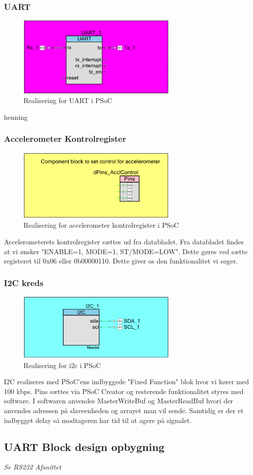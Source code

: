 \subsubsection{UART}
\begin{figure}[H]
\centering
\includegraphics[width=0.7\textwidth]{billeder/uartpsoc}
\caption{Realisering for UART i PSoC}
\label{fig:SMUARTR}
\end{figure}
henning
\subsubsection{Accelerometer Kontrolregister}
\begin{figure}[H]
\centering
\includegraphics[width=0.7\textwidth]{billeder/Kontrolpsoc}
\caption{Realisering for accelerometer kontrolregister i PSoC}
\label{fig:SMAccReg}
\end{figure}
Accelerometerets kontrolregister sættes ud fra databladet. Fra databladet findes at vi ønsker "ENABLE=1, MODE=1, ST/MODE=LOW". Dette gøres ved sætte registeret til 0x06 eller 0b00000110. Dette giver os den funktionalitet vi søger.
\subsubsection{I2C kreds}
\begin{figure}[H]
\centering
\includegraphics[width=0.7\textwidth]{billeder/i2cpsoc}
\caption{Realisering for i2c i PSoC}
\label{fig:SMi2c}
\end{figure}
I2C realiseres med PSoC'ens indbyggede "Fixed Function" blok hvor vi kører med 100 kbps. Pins sættes via PSoC Creator og resterende funktionalitet styres med software. I softwaren anvendes MasterWriteBuf og MasterReadBuf hvori der anvendes adressen på slaveenheden og arrayet man vil sende. Samtidig er der et indbygget delay så modtageren har tid til at agere på signalet. 
\subsection{UART Block design opbygning}
\textit{Se RS232 Afsnittet}